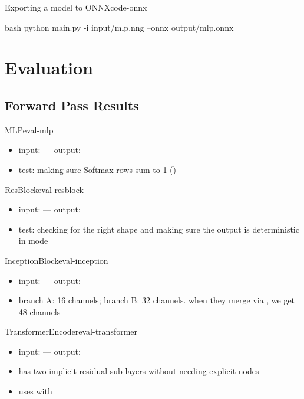 \documentclass{nngraph-en}
\begin{document}
\begin{codebox}{Exporting a model to ONNX}{code-onnx}
\begin{amzcode}{bash}
python main.py -i input/mlp.nng --onnx output/mlp.onnx
\end{amzcode}
\end{codebox}

\chapter{Evaluation}



\section{Forward Pass Results}

\begin{exbox}{MLP}{eval-mlp}
\begin{itemize}[noitemsep]
    \item input:  --- output: 
    \item test: making sure Softmax rows sum to 1 ()
\end{itemize}
\end{exbox}

\begin{exbox}{ResBlock}{eval-resblock}
\begin{itemize}[noitemsep]
    \item input:  --- output: 
    \item test: checking for the right shape and making sure the output is deterministic in  mode
\end{itemize}
\end{exbox}

\begin{exbox}{InceptionBlock}{eval-inception}
\begin{itemize}[noitemsep]
    \item input:  --- output: 
    \item branch A: 16 channels; branch B: 32 channels. when they merge via , we get 48 channels
\end{itemize}
\end{exbox}

\begin{exbox}{TransformerEncoder}{eval-transformer}
\begin{itemize}[noitemsep]
    \item input:  --- output: 
    \item has two implicit residual sub-layers without needing explicit  nodes
    \item uses  with 
\end{itemize}
\end{exbox}
\end{document}
